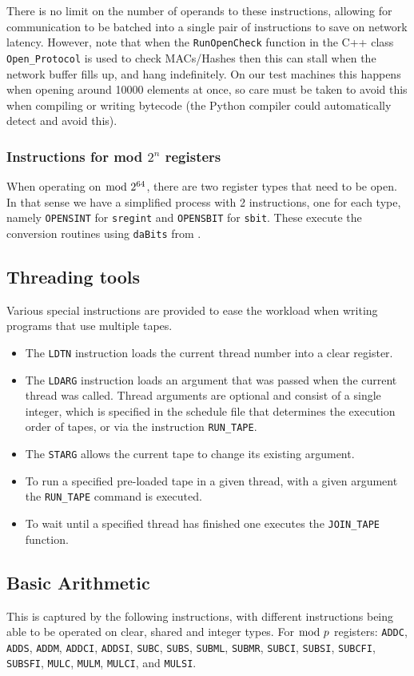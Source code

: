 There is no limit on the number of operands to these instructions,
allowing for communication to be batched into a single pair of
instructions to save on network latency. However, note that when
the \texttt{RunOpenCheck} function in the C++ class \texttt{Open\_Protocol}
is used to check MACs/Hashes then this can stall when the network buffer fills 
up, and hang indefinitely.
On our test machines this happens when opening around 10000 elements
at once, so care must be taken to avoid this when compiling or writing
bytecode (the Python compiler could automatically detect and avoid
this).

\subsubsection{Instructions for mod $2^n$ registers}
When operating on $\bmod \; 2^{64}$, there are two register types that need to be open. In that sense we have a simplified process with 2 instructions, one for each type, namely \verb+OPENSINT+ for \verb+sregint+ and \verb+OPENSBIT+ for \verb|sbit|.
These execute the conversion routines using \verb+daBits+ from \cite{daBitPaper}.

\subsection{Threading tools}
Various special instructions are provided to ease the workload when writing
programs that use multiple tapes. 
\begin{itemize}
\item The \verb+LDTN+ instruction loads the current thread number into 
a clear register.
\item The \verb+LDARG+ instruction loads an argument that was passed 
when the current thread was called.
Thread arguments are optional and consist of a single integer, 
which is specified in the schedule file that determines the execution 
order of tapes, or via the instruction \verb+RUN_TAPE+.
\item The \verb+STARG+ allows the current tape to change its
existing argument.
\item To run a specified pre-loaded tape in a given thread, with
a given argument the \verb+RUN_TAPE+ command is executed.
\item To wait until a specified thread has finished one executes
the \verb+JOIN_TAPE+ function.
\end{itemize}

\subsection{Basic Arithmetic}
This is captured by the following instructions,
with different instructions being able to be operated
on clear, shared and integer types.
For $\bmod \; p$ registers:
    \verb+ADDC+,
    \verb+ADDS+,
    \verb+ADDM+,
    \verb+ADDCI+,
    \verb+ADDSI+,
    \verb+SUBC+,
    \verb+SUBS+,
    \verb+SUBML+,
    \verb+SUBMR+,
    \verb+SUBCI+,
    \verb+SUBSI+,
    \verb+SUBCFI+,
    \verb+SUBSFI+,
    \verb+MULC+,
    \verb+MULM+,
    \verb+MULCI+,
    and
    \verb+MULSI+.

